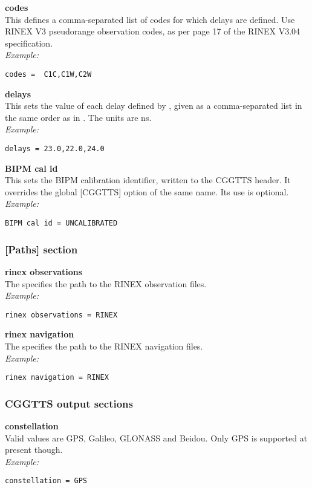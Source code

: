 {\bfseries codes}\\
This defines a comma-separated list of codes for which delays are defined.
Use RINEX V3 pseudorange observation codes, as per page 17 of the RINEX V3.04 specification.\\
\textit{Example:}
\begin{lstlisting}
codes =  C1C,C1W,C2W
\end{lstlisting}

{\bfseries delays}\\
This sets the value of each delay defined by , given as a comma-separated list in the same order as in . The units are ns.  \\
\textit{Example:}
\begin{lstlisting}
delays = 23.0,22.0,24.0
\end{lstlisting}

{\bfseries BIPM cal id}\\
This sets the BIPM calibration identifier, written to the CGGTTS header.
It overrides the global [CGGTTS] option of the same name.
Its use is optional.\\
\textit{Example:}
\begin{lstlisting}
BIPM cal id = UNCALIBRATED
\end{lstlisting}

\subsubsection{[Paths] section }

{\bfseries rinex observations}\\
The specifies the path to the RINEX observation files.\\
\textit{Example:}
\begin{lstlisting}
rinex observations = RINEX
\end{lstlisting}

{\bfseries rinex navigation}\\
The specifies the path to the RINEX navigation files.\\
\textit{Example:}
\begin{lstlisting}
rinex navigation = RINEX
\end{lstlisting}

\subsubsection{CGGTTS output sections }

{\bfseries constellation}\\
Valid values are GPS, Galileo, GLONASS and Beidou.
Only GPS is supported at present though.\\
\textit{Example:}
\begin{lstlisting}
constellation = GPS
\end{lstlisting}

